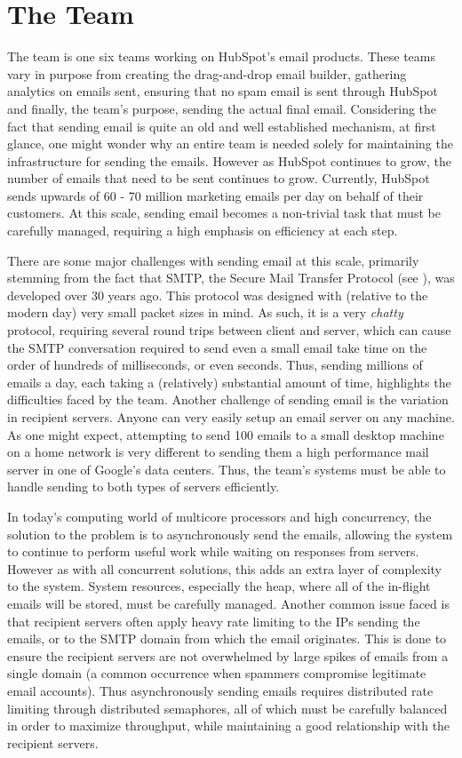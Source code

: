 \section{The \team{} Team} \label{sec:emailSendingInfra}
The \team{} team is one six teams working on HubSpot's email products. These teams vary in purpose from creating the drag-and-drop email builder, gathering analytics on emails sent, ensuring that no spam email is sent through HubSpot and finally, the \team{} team's purpose, sending the actual final email. Considering the fact that sending email is quite an old and well established mechanism, at first glance, one might wonder why an entire team is needed solely for maintaining the infrastructure for sending the emails. However as HubSpot continues to grow, the number of emails that need to be sent continues to grow. Currently, HubSpot sends upwards of 60 - 70 million marketing emails per day on behalf of their customers. At this scale, sending email becomes a non-trivial task that must be carefully managed, requiring a high emphasis on efficiency at each step. 

There are some major challenges with sending email at this scale, primarily stemming from the fact that SMTP, the Secure Mail Transfer Protocol (see ), was developed over 30 years ago. This protocol was designed with (relative to the modern day) very small packet sizes in mind. As such, it is a very \textit{chatty} protocol, requiring several round trips between client and server, which can cause the SMTP conversation required to send even a small email take time on the order of hundreds of milliseconds, or even seconds. Thus, sending millions of emails a day, each taking a (relatively) substantial amount of time, highlights the difficulties faced by the \team{} team. Another challenge of sending email is the variation in recipient servers. Anyone can very easily setup an email server on any machine. As one might expect, attempting to send 100 emails to a small desktop machine on a home network is very different to sending them a high performance mail server in one of Google's data centers. Thus, the \team{} team's systems must be able to handle sending to both types of servers efficiently. 

In today's computing world of multicore processors and high concurrency, the solution to the problem is to asynchronously send the emails, allowing the system to continue to perform useful work while waiting on responses from servers. However as with all concurrent solutions, this adds an extra layer of complexity to the system. System resources, especially the heap, where all of the in-flight emails will be stored, must be carefully managed. Another common issue faced is that recipient servers often apply heavy rate limiting to the IPs sending the emails, or to the SMTP domain from which the email originates. This is done to ensure the recipient servers are not overwhelmed by large spikes of emails from a single domain (a common occurrence when spammers compromise legitimate email accounts). Thus asynchronously sending emails requires distributed rate limiting through distributed semaphores, all of which must be carefully balanced in order to maximize throughput, while maintaining a good relationship with the recipient servers. 

